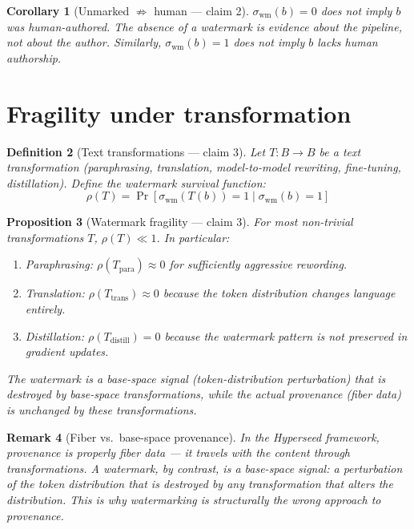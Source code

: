 \documentclass[11pt,a4paper]{article}
\newtheorem{definition}{Definition}[section]
\newtheorem{proposition}[definition]{Proposition}
\newtheorem{corollary}[definition]{Corollary}
\newtheorem{remark}[definition]{Remark}
\begin{document}
\begin{corollary}[Unmarked $\not\Rightarrow$ human --- claim 2]
$\sigma_{\text{wm}}(b) = 0$ does not imply $b$ was human-authored.
The absence of a watermark is evidence about the pipeline, not about
the author. Similarly, $\sigma_{\text{wm}}(b) = 1$ does not imply
$b$ lacks human authorship.
\end{corollary}

\section{Fragility under transformation}
\label{sec:fragility}

\begin{definition}[Text transformations --- claim 3]
\label{def:transforms}
Let $T : B \to B$ be a text transformation (paraphrasing, translation,
model-to-model rewriting, fine-tuning, distillation). Define the
watermark survival function:
\[
  \rho(T) = \Pr[\sigma_{\text{wm}}(T(b)) = 1 \mid \sigma_{\text{wm}}(b) = 1]
\]
\end{definition}

\begin{proposition}[Watermark fragility --- claim 3]
\label{prop:fragility}
For most non-trivial transformations $T$, $\rho(T) \ll 1$. In particular:
\begin{enumerate}
\item Paraphrasing: $\rho(T_{\text{para}}) \approx 0$ for sufficiently
  aggressive rewording.
\item Translation: $\rho(T_{\text{trans}}) \approx 0$ because the token
  distribution changes language entirely.
\item Distillation: $\rho(T_{\text{distill}}) = 0$ because the watermark
  pattern is not preserved in gradient updates.
\end{enumerate}
The watermark is a base-space signal (token-distribution perturbation)
that is destroyed by base-space transformations, while the actual
provenance (fiber data) is unchanged by these transformations.
\end{proposition}

\begin{remark}[Fiber vs.\ base-space provenance]
In the Hyperseed framework, provenance is properly fiber data --- it
travels with the content through transformations. A watermark, by contrast,
is a base-space signal: a perturbation of the token distribution that is
destroyed by any transformation that alters the distribution. This is why
watermarking is structurally the wrong approach to provenance.
\end{remark}
\end{document}
